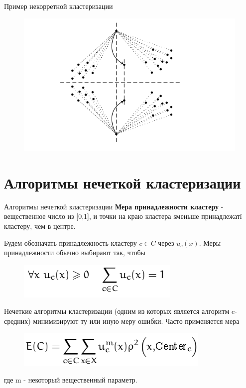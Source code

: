 \documentclass{beamer}
\begin{document}
\begin{frame}{Пример некорретной кластеризации}
\begin{figure}[h]
\centering
\includegraphics[scale=0.75]{images/lec07-pic25.png}
\end{figure}
\end{frame}

\section{Алгоритмы нечеткой кластеризации}

\begin{frame}{Алгоритмы нечеткой кластеризации}
\textbf{Мера принадлежности кластеру} - вещественное число из [0,1], и точки на краю кластера ѕменьше принадлежатї кластеру, чем в центре.

Будем обозначать принадлежность кластеру $c\in C$ через $u_c(x)$. Меры принадлежности обычно выбирают так, чтобы
\begin{figure}[h]
\centering
\includegraphics[scale=0.75]{images/lec07-pic29.png}
\end{figure}
Нечеткие алгоритмы кластеризации (одним из которых является алгоритм c-средних) минимизируют ту или иную меру ошибки. Часто применяется мера
\begin{figure}[h]
\centering
\includegraphics[scale=0.75]{images/lec07-pic30.png}
\end{figure}
где m - некоторый вещественный параметр.
\end{frame}
\end{document}
